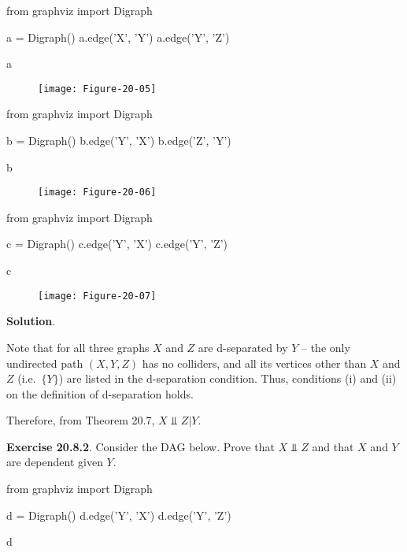 \begin{python}
from graphviz import Digraph

a = Digraph()
a.edge('X', 'Y')
a.edge('Y', 'Z')

a
\end{python}
 
\begin{figure}[H]
\texttt{[image: Figure-20-05]}
\end{figure}

\begin{python}
from graphviz import Digraph

b = Digraph()
b.edge('Y', 'X')
b.edge('Z', 'Y')

b
\end{python}
 
\begin{figure}[H]
\texttt{[image: Figure-20-06]}
\end{figure}

\begin{python}
from graphviz import Digraph

c = Digraph()
c.edge('Y', 'X')
c.edge('Y', 'Z')

c
\end{python}

\begin{figure}[H]
\texttt{[image: Figure-20-07]}
\end{figure}

\textbf{Solution}.

Note that for all three graphs \(X\) and \(Z\) are d-separated by \(Y\)
-- the only undirected path \((X, Y, Z)\) has no colliders, and all its
vertices other than \(X\) and \(Z\) (i.e.~\(\{ Y \}\)) are listed in the
d-separation condition. Thus, conditions (i) and (ii) on the definition
of d-separation holds.

Therefore, from Theorem 20.7, \(X \text{ ⫫ } Z | Y\).

\textbf{Exercise 20.8.2}. Consider the DAG below. Prove that
\(X \text{ ⫫ } Z\) and that \(X\) and \(Y\) are dependent given \(Y\).

\begin{python}
from graphviz import Digraph

d = Digraph()
d.edge('Y', 'X')
d.edge('Y', 'Z')

d
\end{python}


